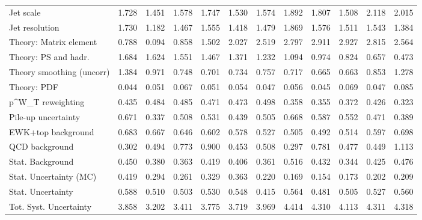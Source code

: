 \begin{tabular}{l|p{0.6cm}p{0.6cm}p{0.6cm}p{0.6cm}p{0.6cm}p{0.6cm}p{0.6cm}p{0.6cm}p{0.6cm}p{0.6cm}p{0.6cm}}
Jet scale                                & 1.728 & 1.451 & 1.578 & 1.747 & 1.530 & 1.574 & 1.892 & 1.807 & 1.508 & 2.118 & 2.015 \\
Jet resolution                           & 1.730 & 1.182 & 1.467 & 1.555 & 1.418 & 1.479 & 1.869 & 1.576 & 1.511 & 1.543 & 1.384 \\
Theory: Matrix element                   & 0.788 & 0.094 & 0.858 & 1.502 & 2.027 & 2.519 & 2.797 & 2.911 & 2.927 & 2.815 & 2.564 \\
Theory: PS and hadr.                     & 1.684 & 1.624 & 1.551 & 1.467 & 1.371 & 1.232 & 1.094 & 0.974 & 0.824 & 0.657 & 0.473 \\
Theory smoothing (uncorr)                & 1.384 & 0.971 & 0.748 & 0.701 & 0.734 & 0.757 & 0.717 & 0.665 & 0.663 & 0.853 & 1.278 \\
Theory: PDF                              & 0.044 & 0.051 & 0.067 & 0.051 & 0.054 & 0.047 & 0.056 & 0.045 & 0.069 & 0.047 & 0.085 \\
p^{W}_{T} reweighting                    & 0.435 & 0.484 & 0.485 & 0.471 & 0.473 & 0.498 & 0.358 & 0.355 & 0.372 & 0.426 & 0.323 \\
Pile-up uncertainty                      & 0.671 & 0.337 & 0.508 & 0.531 & 0.439 & 0.505 & 0.668 & 0.587 & 0.552 & 0.471 & 0.389 \\
EWK+top background                       & 0.683 & 0.667 & 0.646 & 0.602 & 0.578 & 0.527 & 0.505 & 0.492 & 0.514 & 0.597 & 0.698 \\
QCD background                           & 0.302 & 0.494 & 0.773 & 0.900 & 0.453 & 0.508 & 0.297 & 0.781 & 0.477 & 0.449 & 1.113 \\
Stat. Background                         & 0.450 & 0.380 & 0.363 & 0.419 & 0.406 & 0.361 & 0.516 & 0.432 & 0.344 & 0.425 & 0.476 \\
Stat. Uncertainty (MC)                   & 0.419 & 0.294 & 0.261 & 0.329 & 0.363 & 0.220 & 0.169 & 0.154 & 0.173 & 0.202 & 0.209 \\
\hline
Stat. Uncertainty                        & 0.588 & 0.510 & 0.503 & 0.530 & 0.548 & 0.415 & 0.564 & 0.481 & 0.505 & 0.527 & 0.560 \\
\hline
Tot. Syst. Uncertainty                   & 3.858 & 3.202 & 3.411 & 3.775 & 3.719 & 3.969 & 4.414 & 4.310 & 4.113 & 4.311 & 4.318 \\
\hline
\end{tabular}
